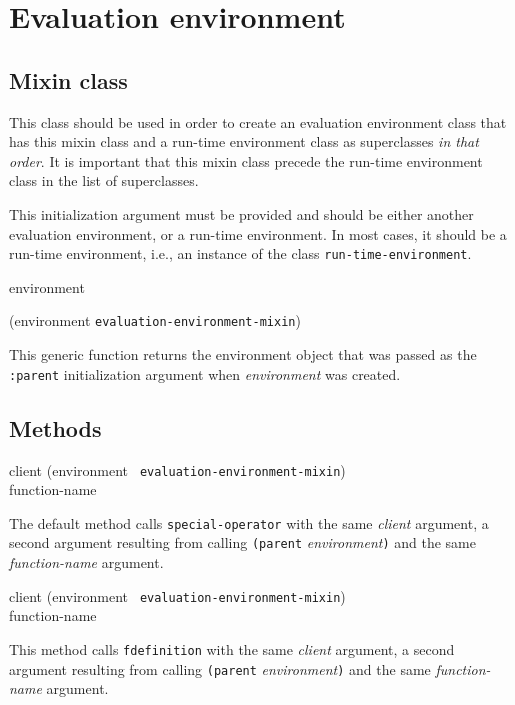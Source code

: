 \chapter{Evaluation environment}

\section{Mixin class}


This class should be used in order to create an evaluation environment
class that has this mixin class and a run-time environment class as
superclasses \emph{in that order}.  It is important that this mixin
class precede the run-time environment class in the list of
superclasses.


This initialization argument must be provided and should be either
another evaluation environment, or a run-time environment.  In most
cases, it should be a run-time environment, i.e., an instance of the
class \texttt{run-time-environment}.

 {environment}

 {(environment {\tt evaluation-environment-mixin})}

This generic function returns the environment object that was passed
as the \texttt{:parent} initialization argument when
\textit{environment} was created.

\section{Methods}

{\small{} {client (environment {\tt
      evaluation-environment-mixin}) \\ function-name}
}

The default method calls \texttt{special-operator} with the same
\textit{client} argument, a second argument resulting from calling
\texttt{(parent} \textit{environment}\texttt{)} and the same
\textit{function-name} argument.

{\small{} {client (environment {\tt
      evaluation-environment-mixin}) \\ function-name}
}

This method calls \texttt{fdefinition} with the same \textit{client}
argument, a second argument resulting from calling \texttt{(parent}
\textit{environment}\texttt{)} and the same \textit{function-name}
argument.

